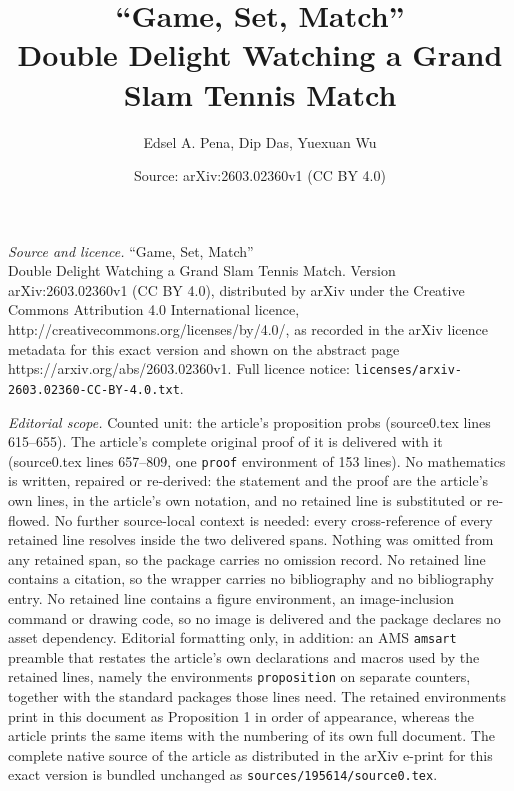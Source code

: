\documentclass[10pt,a4paper]{amsart}
\title{``Game, Set, Match'' \\ Double Delight Watching a Grand Slam Tennis Match}
\author{Edsel A. Pena, Dip Das, Yuexuan Wu}
\date{Source: arXiv:2603.02360v1 (CC BY 4.0)}
\begin{document}
\maketitle

\noindent\emph{Source and licence.} ``Game, Set, Match'' \\ Double Delight Watching a Grand Slam Tennis Match. Version arXiv:2603.02360v1 (CC BY 4.0), distributed by arXiv under the Creative Commons Attribution 4.0 International licence, http://creativecommons.org/licenses/by/4.0/, as recorded in the arXiv licence metadata for this exact version and shown on the abstract page https://arxiv.org/abs/2603.02360v1. Full licence notice: \texttt{licenses/arxiv-2603.02360-CC-BY-4.0.txt}.\par\smallskip

\noindent\textit{Editorial scope.} Counted unit: the article's proposition probs (source0.tex lines 615--655). The article's complete original proof of it is delivered with it (source0.tex lines 657--809, one \texttt{proof} environment of 153 lines). No mathematics is written, repaired or re-derived: the statement and the proof are the article's own lines, in the article's own notation, and no retained line is substituted or re-flowed.  No further source-local context is needed: every cross-reference of every retained line resolves inside the two delivered spans.  Nothing was omitted from any retained span, so the package carries no omission record.  No retained line contains a citation, so the wrapper carries no bibliography and no bibliography entry.  No retained line contains a figure environment, an image-inclusion command or drawing code, so no image is delivered and the package declares no asset dependency.  Editorial formatting only, in addition: an AMS \texttt{amsart} preamble that restates the article's own declarations and macros used by the retained lines, namely the environments \texttt{proposition} on separate counters, together with the standard packages those lines need.  The retained environments print in this document as Proposition 1 in order of appearance, whereas the article prints the same items with the numbering of its own full document.  The complete native source of the article as distributed in the arXiv e-print for this exact version is bundled unchanged as \texttt{sources/195614/source0.tex}.
\end{document}
